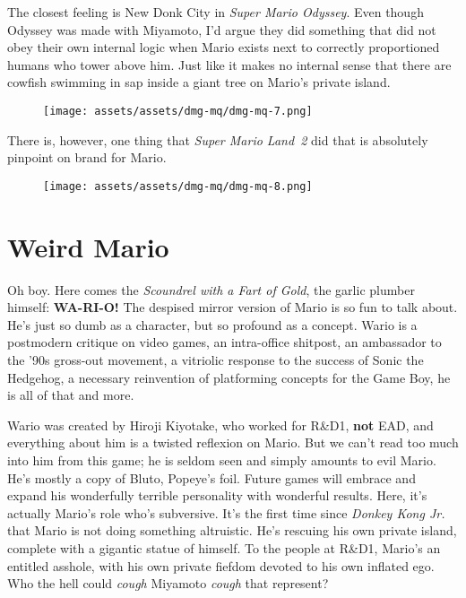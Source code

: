 \documentclass{book}
\begin{document}
The closest feeling is New Donk City in \emph{Super Mario Odyssey}. Even though Odyssey was made with Miyamoto, I’d argue they did something that did not obey their own internal logic when Mario exists next to correctly proportioned humans who tower above him. Just like it makes no internal sense that there are cowfish swimming in sap inside a giant tree on Mario’s private island.

\begin{figure}[hbt]
\vskip 10pt
\centering \texttt{[image: assets/assets/dmg-mq/dmg-mq-7.png]}
\vskip 6pt
\end{figure}

There is, however, one thing that \emph{Super Mario Land 2} did that is absolutely pinpoint on brand for Mario.

\begin{figure}[hbt]
\vskip 10pt
\centering \texttt{[image: assets/assets/dmg-mq/dmg-mq-8.png]}
\vskip 6pt
\end{figure}

\FloatBarrier\needspace{10mm}\section*{Weird Mario}\nopagebreak[4]

Oh boy. Here comes the \emph{Scoundrel with a Fart of Gold}, the garlic plumber himself: \textbf{WA-RI-O!} The despised mirror version of Mario is so fun to talk about. He’s just so dumb as a character, but so profound as a concept. Wario is a postmodern critique on video games, an intra-office shitpost, an ambassador to the ’90s gross-out movement, a vitriolic response to the success of Sonic the Hedgehog, a necessary reinvention of platforming concepts for the Game Boy, he is all of that and more.

Wario was created by Hiroji Kiyotake, who worked for R\&D1, \textbf{not} EAD, and everything about him is a twisted reflexion on Mario. But we can’t read too much into him from this game; he is seldom seen and simply amounts to evil Mario. He’s mostly a copy of Bluto, Popeye’s foil. Future games will embrace and expand his wonderfully terrible personality with wonderful results. Here, it’s actually Mario’s role who’s subversive. It’s the first time since \emph{Donkey Kong Jr.} that Mario is not doing something altruistic. He’s rescuing his own private island, complete with a gigantic statue of himself. To the people at R\&D1, Mario’s an entitled asshole, with his own private fiefdom devoted to his own inflated ego. Who the hell could \emph{cough} Miyamoto \emph{cough} that represent?
\end{document}
